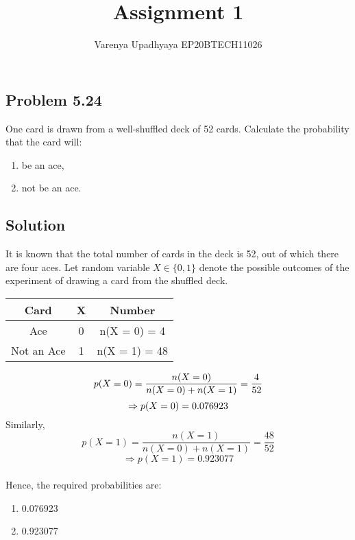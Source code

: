 \documentclass[a4paper, twocolumn]{article}
\title{Assignment 1}
\author{Varenya Upadhyaya EP20BTECH11026}
\date{}
\begin{document}
    \maketitle   
    \begin{center}
    \section*{Problem 5.24}
    \end{center}
    One card is drawn from a well-shuffled deck of 52 cards. Calculate the probability that the card will:
    \begin{enumerate}[label=(\roman*)]
        \item be an ace,
        \item not be an ace.
    \end{enumerate}
    \begin{center}
    \maketitle
        \section*{Solution}
    \end{center}
    It is known that the total number of cards in the deck is 52, out of which there are four aces. Let random variable $X \in \{0,1\}$ denote the possible outcomes of the experiment of drawing a card from the shuffled deck.\\
    \begin{center}
        \begin{tabular}{|c|c|c|}
        \hline
        \textbf{Card} & \textbf{X} & \textbf{Number}\\
        \hline
        Ace & 0 & n(X = 0) = 4\\
        \hline
        Not an Ace & 1 & n(X = 1) = 48\\
        \hline
        \end{tabular}
    \end{center}
    
    
    \begin{equation}
        p(X=0) = \frac{n(X = 0)}{n(X = 0) + n(X = 1)} = \frac{4}{52}\\
    \end{equation}
    \begin{equation}
        \Rightarrow p(X=0) = 0.076923\\
    \end{equation}
    Similarly,\\
    \begin{equation}
        p(X = 1) = \frac{n(X=1)}{n(X=0)+n(X=1)} = \frac{48}{52}
    \end{equation}
    \begin{equation}
        \Rightarrow p(X=1) = 0.923077
    \end{equation}
    \\Hence, the required probabilities are:
    \begin{enumerate}[label=(\roman*)]
        \item 0.076923
        \item 0.923077
    \end{enumerate}
\end{document}
